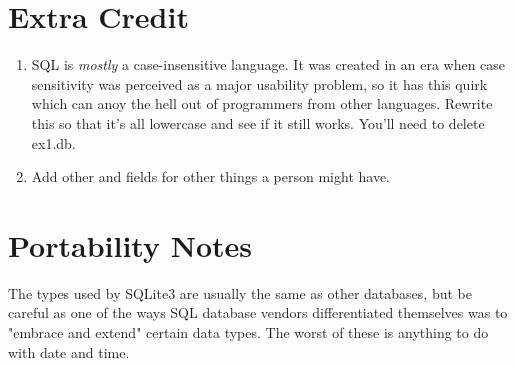 \section{Extra Credit}

\begin{enumerate}
\item SQL is \emph{mostly} a case-insensitive language. It was created in an
    era when case sensitivity was perceived as a major usability problem, so
    it has this quirk which can anoy the hell out of programmers from other
    languages.  Rewrite this so that it's all lowercase and see if it still
    works.  You'll need to delete ex1.db.
\item Add other  and  fields for other things
    a person might have.
\end{enumerate}

\section{Portability Notes}

The types used by SQLite3 are usually the same as other databases, but be
careful as one of the ways SQL database vendors differentiated themselves was
to "embrace and extend" certain data types.  The worst of these is anything
to do with date and time.
